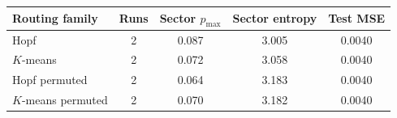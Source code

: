 \begin{tabular}{lcccc}
\toprule
Routing family & Runs & Sector $p_{\max}$ & Sector entropy & Test MSE \\
\midrule
Hopf & 2 & 0.087 & 3.005 & 0.0040 \\
$K$-means & 2 & 0.072 & 3.058 & 0.0040 \\
Hopf permuted & 2 & 0.064 & 3.183 & 0.0040 \\
$K$-means permuted & 2 & 0.070 & 3.182 & 0.0040 \\
\bottomrule
\end{tabular}

